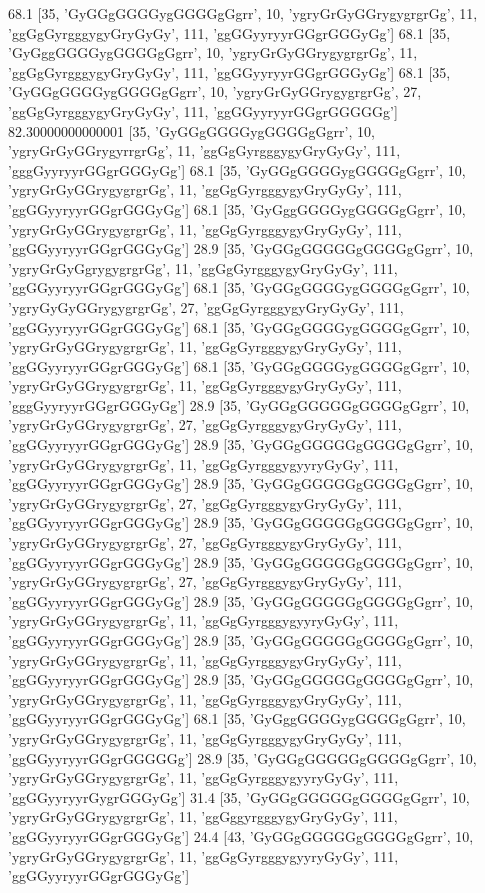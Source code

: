 68.1 [35, 'GyGGgGGGGygGGGGgGgrr', 10, 'ygryGrGyGGrygygrgrGg', 11, 'ggGgGyrgggygyGryGyGy', 111, 'ggGGyyryyrGGgrGGGyGg']
68.1 [35, 'GyGggGGGGygGGGGgGgrr', 10, 'ygryGrGyGGrygygrgrGg', 11, 'ggGgGyrgggygyGryGyGy', 111, 'ggGGyyryyrGGgrGGGyGg']
68.1 [35, 'GyGGgGGGGygGGGGgGgrr', 10, 'ygryGrGyGGrygygrgrGg', 27, 'ggGgGyrgggygyGryGyGy', 111, 'ggGGyyryyrGGgrGGGGGg']
82.30000000000001 [35, 'GyGGgGGGGygGGGGgGgrr', 10, 'ygryGrGyGGrygyrrgrGg', 11, 'ggGgGyrgggygyGryGyGy', 111, 'gggGyyryyrGGgrGGGyGg']
68.1 [35, 'GyGGgGGGGygGGGGgGgrr', 10, 'ygryGrGyGGrygygrgrGg', 11, 'ggGgGyrgggygyGryGyGy', 111, 'ggGGyyryyrGGgrGGGyGg']
68.1 [35, 'GyGggGGGGygGGGGgGgrr', 10, 'ygryGrGyGGrygygrgrGg', 11, 'ggGgGyrgggygyGryGyGy', 111, 'ggGGyyryyrGGgrGGGyGg']
28.9 [35, 'GyGGgGGGGGgGGGGgGgrr', 10, 'ygryGrGyGgrygygrgrGg', 11, 'ggGgGyrgggygyGryGyGy', 111, 'ggGGyyryyrGGgrGGGyGg']
68.1 [35, 'GyGGgGGGGygGGGGgGgrr', 10, 'ygryGyGyGGrygygrgrGg', 27, 'ggGgGyrgggygyGryGyGy', 111, 'ggGGyyryyrGGgrGGGyGg']
68.1 [35, 'GyGGgGGGGygGGGGgGgrr', 10, 'ygryGrGyGGrygygrgrGg', 11, 'ggGgGyrgggygyGryGyGy', 111, 'ggGGyyryyrGGgrGGGyGg']
68.1 [35, 'GyGGgGGGGygGGGGgGgrr', 10, 'ygryGrGyGGrygygrgrGg', 11, 'ggGgGyrgggygyGryGyGy', 111, 'gggGyyryyrGGgrGGGyGg']
28.9 [35, 'GyGGgGGGGGgGGGGgGgrr', 10, 'ygryGrGyGGrygygrgrGg', 27, 'ggGgGyrgggygyGryGyGy', 111, 'ggGGyyryyrGGgrGGGyGg']
28.9 [35, 'GyGGgGGGGGgGGGGgGgrr', 10, 'ygryGrGyGGrygygrgrGg', 11, 'ggGgGyrgggygyyryGyGy', 111, 'ggGGyyryyrGGgrGGGyGg']
28.9 [35, 'GyGGgGGGGGgGGGGgGgrr', 10, 'ygryGrGyGGrygygrgrGg', 27, 'ggGgGyrgggygyGryGyGy', 111, 'ggGGyyryyrGGgrGGGyGg']
28.9 [35, 'GyGGgGGGGGgGGGGgGgrr', 10, 'ygryGrGyGGrygygrgrGg', 27, 'ggGgGyrgggygyGryGyGy', 111, 'ggGGyyryyrGGgrGGGyGg']
28.9 [35, 'GyGGgGGGGGgGGGGgGgrr', 10, 'ygryGrGyGGrygygrgrGg', 27, 'ggGgGyrgggygyGryGyGy', 111, 'ggGGyyryyrGGgrGGGyGg']
28.9 [35, 'GyGGgGGGGGgGGGGgGgrr', 10, 'ygryGrGyGGrygygrgrGg', 11, 'ggGgGyrgggygyyryGyGy', 111, 'ggGGyyryyrGGgrGGGyGg']
28.9 [35, 'GyGGgGGGGGgGGGGgGgrr', 10, 'ygryGrGyGGrygygrgrGg', 11, 'ggGgGyrgggygyGryGyGy', 111, 'ggGGyyryyrGGgrGGGyGg']
28.9 [35, 'GyGGgGGGGGgGGGGgGgrr', 10, 'ygryGrGyGGrygygrgrGg', 11, 'ggGgGyrgggygyGryGyGy', 111, 'ggGGyyryyrGGgrGGGyGg']
68.1 [35, 'GyGggGGGGygGGGGgGgrr', 10, 'ygryGrGyGGrygygrgrGg', 11, 'ggGgGyrgggygyGryGyGy', 111, 'ggGGyyryyrGGgrGGGGGg']
28.9 [35, 'GyGGgGGGGGgGGGGgGgrr', 10, 'ygryGrGyGGrygygrgrGg', 11, 'ggGgGyrgggygyyryGyGy', 111, 'ggGGyyryyrGygrGGGyGg']
31.4 [35, 'GyGGgGGGGGgGGGGgGgrr', 10, 'ygryGrGyGGrygygrgrGg', 11, 'ggGggyrgggygyGryGyGy', 111, 'ggGGyyryyrGGgrGGGyGg']
24.4 [43, 'GyGGgGGGGGgGGGGgGgrr', 10, 'ygryGrGyGGrygygrgrGg', 11, 'ggGgGyrgggygyyryGyGy', 111, 'ggGGyyryyrGGgrGGGyGg']
